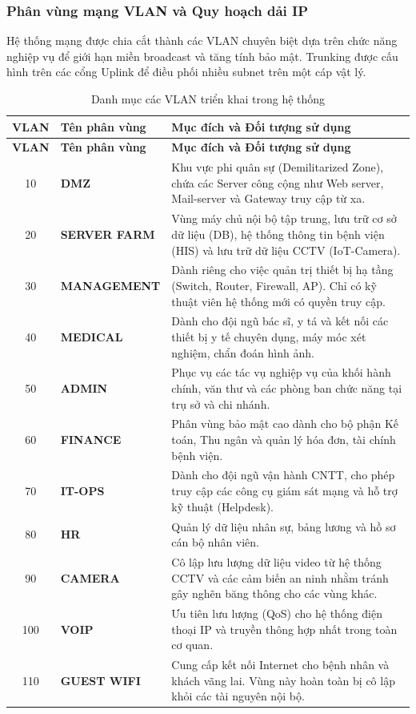 \subsubsection{Phân vùng mạng VLAN và Quy hoạch dải IP}
Hệ thống mạng được chia cắt thành các VLAN chuyên biệt dựa trên chức năng nghiệp vụ để giới hạn miền broadcast và tăng tính bảo mật. Trunking được cấu hình trên các cổng Uplink để điều phối nhiều subnet trên một cáp vật lý.
\renewcommand{\arraystretch}{1.2}
\begin{longtable}{|c|l|>{\raggedright\arraybackslash}p{9.5cm}|}
\hline
\textbf{VLAN} & \textbf{Tên phân vùng} & \textbf{Mục đích và Đối tượng sử dụng} \\ \hline
\endfirsthead

\hline
\textbf{VLAN} & \textbf{Tên phân vùng} & \textbf{Mục đích và Đối tượng sử dụng} \\ \hline
\endhead

\hline
\endfoot

\hline
\caption{Danh mục các VLAN triển khai trong hệ thống}
\label{tab:vlan_definition}
\endlastfoot

10 & \textbf{DMZ} & Khu vực phi quân sự (Demilitarized Zone), chứa các Server công cộng như Web server, Mail-server và Gateway truy cập từ xa. \\ \hline
20 & \textbf{SERVER FARM} & Vùng máy chủ nội bộ tập trung, lưu trữ cơ sở dữ liệu (DB), hệ thống thông tin bệnh viện (HIS) và lưu trữ dữ liệu CCTV (IoT-Camera). \\ \hline
30 & \textbf{MANAGEMENT} & Dành riêng cho việc quản trị thiết bị hạ tầng (Switch, Router, Firewall, AP). Chỉ có kỹ thuật viên hệ thống mới có quyền truy cập. \\ \hline
40 & \textbf{MEDICAL} & Dành cho đội ngũ bác sĩ, y tá và kết nối các thiết bị y tế chuyên dụng, máy móc xét nghiệm, chẩn đoán hình ảnh. \\ \hline
50 & \textbf{ADMIN} & Phục vụ các tác vụ nghiệp vụ của khối hành chính, văn thư và các phòng ban chức năng tại trụ sở và chi nhánh. \\ \hline
60 & \textbf{FINANCE} & Phân vùng bảo mật cao dành cho bộ phận Kế toán, Thu ngân và quản lý hóa đơn, tài chính bệnh viện. \\ \hline
70 & \textbf{IT-OPS} & Dành cho đội ngũ vận hành CNTT, cho phép truy cập các công cụ giám sát mạng và hỗ trợ kỹ thuật (Helpdesk). \\ \hline
80 & \textbf{HR} & Quản lý dữ liệu nhân sự, bảng lương và hồ sơ cán bộ nhân viên. \\ \hline
90 & \textbf{CAMERA} & Cô lập lưu lượng dữ liệu video từ hệ thống CCTV và các cảm biến an ninh nhằm tránh gây nghẽn băng thông cho các vùng khác. \\ \hline
100 & \textbf{VOIP} & Ưu tiên lưu lượng (QoS) cho hệ thống điện thoại IP và truyền thông hợp nhất trong toàn cơ quan. \\ \hline
110 & \textbf{GUEST WIFI} & Cung cấp kết nối Internet cho bệnh nhân và khách vãng lai. Vùng này hoàn toàn bị cô lập khỏi các tài nguyên nội bộ. \\ \hline
\end{longtable}
